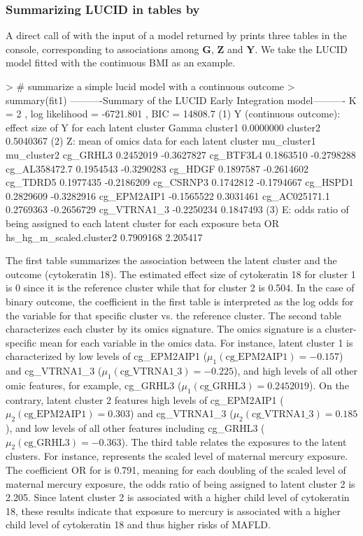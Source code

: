 \subsubsection{Summarizing LUCID in tables by }
 A direct call of  with the input of a model returned by  prints three tables in the console, corresponding to associations among $\bm G$, $\bm Z$ and $\bm Y$. We take the LUCID model fitted with the continuous BMI as an example.
\begin{example}
> # summarize a simple lucid model with a continuous outcome
> summary(fit1)
----------Summary of the LUCID Early Integration model---------- 
K =  2 , log likelihood = -6721.801 , BIC =  14808.7 
(1) Y (continuous outcome): effect size of Y for each latent cluster
             Gamma
cluster1 0.0000000
cluster2 0.5040367
(2) Z: mean of omics data for each latent cluster 
              mu_cluster1 mu_cluster2
cg_GRHL3        0.2452019  -0.3627827
cg_BTF3L4       0.1863510  -0.2798288
cg_AL358472.7   0.1954543  -0.3290283
cg_HDGF         0.1897587  -0.2614602
cg_TDRD5        0.1977435  -0.2186209
cg_CSRNP3       0.1742812  -0.1794667
cg_HSPD1        0.2829609  -0.3282916
cg_EPM2AIP1    -0.1565522   0.3031461
cg_AC025171.1   0.2769363  -0.2656729
cg_VTRNA1_3    -0.2250234   0.1847493
(3) E: odds ratio of being assigned to each latent cluster for each exposure 
                             beta       OR
hs_hg_m_scaled.cluster2 0.7909168 2.205417
\end{example}
The first table summarizes the association between the latent cluster and the outcome (cytokeratin 18). The estimated effect size of cytokeratin 18 for cluster 1 is 0 since it is the reference cluster while that for cluster 2 is 0.504. In the case of binary outcome, the coefficient in the first table is interpreted as the log odds for the variable for that specific cluster vs. the reference cluster. The second table characterizes each cluster by its omics signature. The omics signature is a cluster-specific mean for each variable in the omics data. For instance, latent cluster 1 is characterized by low levels of cg\_EPM2AIP1 ($\mu_1 (\text{cg\_EPM2AIP1})= -0.157$) and cg\_VTRNA1\_3 ($\mu_1 (\text{cg\_VTRNA1\_3})= -0.225$), and high levels of all other omic features, for example, cg\_GRHL3 ($\mu_1 (\text{cg{\_}GRHL3})= 0.2452019$). On the contrary, latent cluster 2 features high levels of cg{\_}EPM2AIP1 ($\mu_2 (\text{cg{\_}EPM2AIP1})=  0.303$) and cg{\_}VTRNA1{\_}3 ($\mu_2 (\text{cg{\_}VTRNA1{\_}3})= 0.185$), and low levels of all other features including cg{\_}GRHL3 ($\mu_2 (\text{cg{\_}GRHL3})= -0.363$). The third table relates the exposures to the latent clusters. For instance,  represents the scaled level of maternal mercury exposure. The coefficient OR for  is 0.791, meaning for each doubling of the scaled level of maternal mercury exposure, the odds ratio of being assigned to latent cluster 2 is 2.205. Since latent cluster 2 is associated with a higher child level of cytokeratin 18, these results indicate that exposure to mercury is associated with a higher child level of cytokeratin 18 and thus higher risks of MAFLD.
